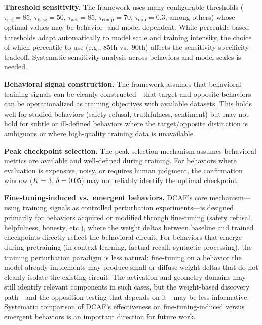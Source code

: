 \documentclass[11pt]{article}
\begin{document}
\textbf{Threshold sensitivity.} The framework uses many configurable thresholds ($\tau_{\text{sig}}=85$, $\tau_{\text{base}}=50$, $\tau_{\text{act}}=85$, $\tau_{\text{comp}}=70$, $\tau_{\text{opp}}=0.3$, among others) whose optimal values may be behavior- and model-dependent. While percentile-based thresholds adapt automatically to model scale and training intensity, the choice of which percentile to use (e.g., 85th vs.\ 90th) affects the sensitivity-specificity tradeoff. Systematic sensitivity analysis across behaviors and model scales is needed.

\textbf{Behavioral signal construction.} The framework assumes that behavioral training signals can be cleanly constructed---that target and opposite behaviors can be operationalized as training objectives with available datasets. This holds well for studied behaviors (safety refusal, truthfulness, sentiment) but may not hold for subtle or ill-defined behaviors where the target/opposite distinction is ambiguous or where high-quality training data is unavailable.

\textbf{Peak checkpoint selection.} The peak selection mechanism assumes behavioral metrics are available and well-defined during training. For behaviors where evaluation is expensive, noisy, or requires human judgment, the confirmation window ($K=3$, $\delta=0.05$) may not reliably identify the optimal checkpoint.

\textbf{Fine-tuning-induced vs.\ emergent behaviors.} DCAF's core mechanism---using training signals as controlled perturbation experiments---is designed primarily for behaviors acquired or modified through fine-tuning (safety refusal, helpfulness, honesty, etc.), where the weight deltas between baseline and trained checkpoints directly reflect the behavioral circuit. For behaviors that emerge during pretraining (in-context learning, factual recall, syntactic processing), the training perturbation paradigm is less natural: fine-tuning on a behavior the model already implements may produce small or diffuse weight deltas that do not cleanly isolate the existing circuit. The activation and geometry domains may still identify relevant components in such cases, but the weight-based discovery path---and the opposition testing that depends on it---may be less informative. Systematic comparison of DCAF's effectiveness on fine-tuning-induced versus emergent behaviors is an important direction for future work.
\end{document}
